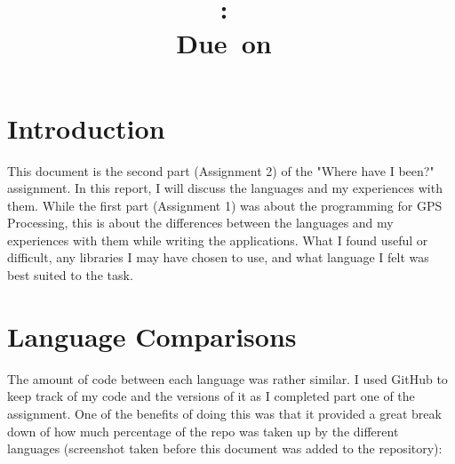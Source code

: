 \documentclass{article}
\title{
\vspace{2in}
\textmd{\textbf{\hmwkClass:\ \hmwkTitle}}\\
\normalsize\vspace{0.1in}\small{Due\ on\ \hmwkDueDate}\\
\vspace{3in}
}
\author{\textbf{\hmwkAuthorName}}
\date{} %
\begin{document}
\maketitle



\newpage
\tableofcontents
\newpage



\section{Introduction}
This document is the second part (Assignment 2\cite{assignment2}) of the "Where have I been?" assignment. In this report, I will discuss the languages and my experiences with them. While the first part (Assignment 1\cite{assignment1}) was about the programming for GPS Processing, this is about the differences between the languages and my experiences with them while writing the applications. What I found useful or difficult, any libraries I may have chosen to use, and what language I felt was best suited to the task.



\section{Language Comparisons}

The amount of code between each language was rather similar. I used GitHub\cite{github} to keep track of my code and the versions of it as I completed part one of the assignment. One of the benefits of doing this was that it provided a great break down of how much percentage of the repo was taken up by the different languages (screenshot taken before this document was added to the repository):
\end{document}
